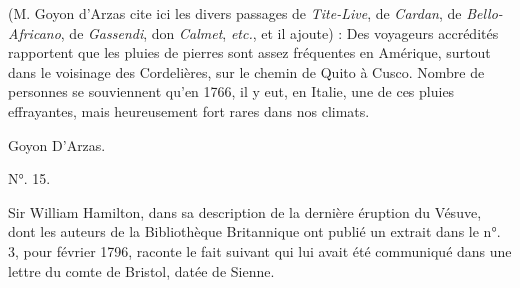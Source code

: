 \documentclass[a4paper, 11pt, oneside, polutonikogreek, french]{article}
\begin{document}
(M. Goyon d'Arzas cite ici les divers passages de \emph{Tite-Live}, de \emph{Cardan}, de \emph{Bello-Africano}, de \emph{Gassendi}, don \emph{Calmet}, \emph{etc.}, et il ajoute) : Des voyageurs accrédités rapportent que les pluies de pierres sont assez fréquentes en Amérique, surtout dans le voisinage des Cordelières, sur le chemin de Quito à Cusco. Nombre de personnes se souviennent qu'en 1766, il y eut, en Italie, une de ces pluies effrayantes, mais heureusement fort rares dans nos climats.

Goyon D'Arzas.

\begin{center}
N°. 15.
\end{center}

Sir William Hamilton, dans sa description de la dernière éruption du Vésuve, dont les auteurs de la Bibliothèque Britannique ont publié un extrait dans le n°. 3, pour février 1796, raconte le fait suivant qui lui avait été communiqué dans une lettre du comte de Bristol, datée de Sienne.
\end{document}

